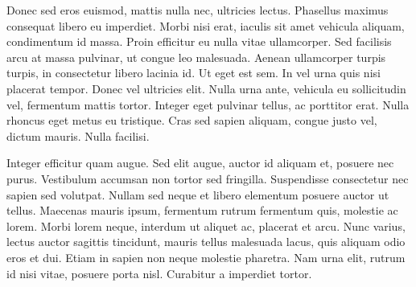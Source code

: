Donec sed eros euismod, mattis nulla nec, ultricies lectus. Phasellus maximus consequat libero eu imperdiet. Morbi nisi
erat, iaculis sit amet vehicula aliquam, condimentum id massa. Proin efficitur eu nulla vitae ullamcorper. Sed facilisis
arcu at massa pulvinar, ut congue leo malesuada. Aenean ullamcorper turpis turpis, in consectetur libero lacinia id. Ut
eget est sem. In vel urna quis nisi placerat tempor. Donec vel ultricies elit. Nulla urna ante, vehicula eu sollicitudin
vel, fermentum mattis tortor. Integer eget pulvinar tellus, ac porttitor erat. Nulla rhoncus eget metus eu tristique.
Cras sed sapien aliquam, congue justo vel, dictum mauris. Nulla facilisi.

Integer efficitur quam augue. Sed elit augue, auctor id aliquam et, posuere nec purus. Vestibulum accumsan non tortor
sed fringilla. Suspendisse consectetur nec sapien sed volutpat. Nullam sed neque et libero elementum posuere auctor ut
tellus. Maecenas mauris ipsum, fermentum rutrum fermentum quis, molestie ac lorem. Morbi lorem neque, interdum ut
aliquet ac, placerat et arcu. Nunc varius, lectus auctor sagittis tincidunt, mauris tellus malesuada lacus, quis aliquam
odio eros et dui. Etiam in sapien non neque molestie pharetra. Nam urna elit, rutrum id nisi vitae, posuere porta nisl.
Curabitur a imperdiet tortor.

